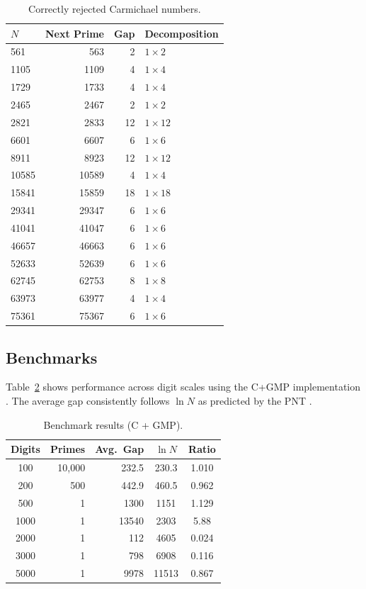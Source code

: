 \documentclass{sbc2023-pdf}%
\theoremstyle{plain}
\begin{document}
\begin{table}[htbp]
\centering
\caption{Correctly rejected Carmichael numbers.}
\label{tab:carmichael}
\begin{tabular}{lrrl}
\toprule
\(N\) & Next Prime & Gap & Decomposition \\
\midrule
561 & 563 & 2 & \(1\times2\) \\
1105 & 1109 & 4 & \(1\times4\) \\
1729 & 1733 & 4 & \(1\times4\) \\
2465 & 2467 & 2 & \(1\times2\) \\
2821 & 2833 & 12 & \(1\times12\) \\
6601 & 6607 & 6 & \(1\times6\) \\
8911 & 8923 & 12 & \(1\times12\) \\
10585 & 10589 & 4 & \(1\times4\) \\
15841 & 15859 & 18 & \(1\times18\) \\
29341 & 29347 & 6 & \(1\times6\) \\
41041 & 41047 & 6 & \(1\times6\) \\
46657 & 46663 & 6 & \(1\times6\) \\
52633 & 52639 & 6 & \(1\times6\) \\
62745 & 62753 & 8 & \(1\times8\) \\
63973 & 63977 & 4 & \(1\times4\) \\
75361 & 75367 & 6 & \(1\times6\) \\
\bottomrule
\end{tabular}
\end{table}

\subsection{Benchmarks}
\label{sec:bench}

Table~\ref{tab:bench} shows performance across digit scales using the C+GMP implementation \citep{gmp2020}. The average gap consistently follows \(\ln N\) as predicted by the PNT \citep{titchmarsh1986}.

\begin{table}[htbp]
\centering
\caption{Benchmark results (C + GMP).}
\label{tab:bench}
\begin{tabular}{crrcc}
\toprule
Digits & Primes & Avg.\ Gap & \(\ln N\) & Ratio \\
\midrule
100 & 10,000 & 232.5 & 230.3 & 1.010 \\
200 & 500 & 442.9 & 460.5 & 0.962 \\
500 & 1 & 1300 & 1151 & 1.129 \\
1000 & 1 & 13540 & 2303 & 5.88 \\
2000 & 1 & 112 & 4605 & 0.024 \\
3000 & 1 & 798 & 6908 & 0.116 \\
5000 & 1 & 9978 & 11513 & 0.867 \\
\bottomrule
\end{tabular}
\end{table}
\end{document}
